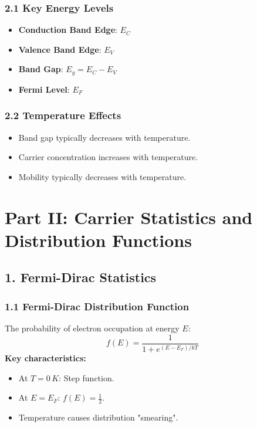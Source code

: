 \documentclass[12pt]{article}
\begin{document}
\subsubsection{2.1 Key Energy Levels}
\begin{itemize}
    \item \textbf{Conduction Band Edge}: \( E_C \)
    \item \textbf{Valence Band Edge}: \( E_V \)
    \item \textbf{Band Gap}: \( E_g = E_C - E_V \)
    \item \textbf{Fermi Level}: \( E_F \)
\end{itemize}

\subsubsection{2.2 Temperature Effects}
\begin{itemize}
    \item Band gap typically decreases with temperature.
    \item Carrier concentration increases with temperature.
    \item Mobility typically decreases with temperature.
\end{itemize}

\section{Part II: Carrier Statistics and Distribution Functions}

\subsection{1. Fermi-Dirac Statistics}

\subsubsection{1.1 Fermi-Dirac Distribution Function}
The probability of electron occupation at energy \( E \):
\[
f(E) = \frac{1}{1 + e^{(E - E_F)/kT}}
\]
\textbf{Key characteristics:}
\begin{itemize}
    \item At \( T = 0\,K \): Step function.
    \item At \( E = E_F \): \( f(E) = \frac{1}{2} \).
    \item Temperature causes distribution "smearing".
\end{itemize}
\end{document}
